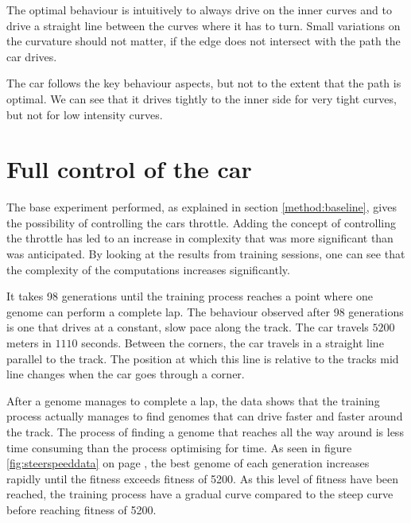 The optimal behaviour is intuitively to always drive on the inner curves and to drive a straight line between the curves where it has to turn. Small variations on the curvature should not matter, if the edge does not intersect with the path the car drives.

The car follows the key behaviour aspects, but not to the extent that the path is optimal. We can see that it drives tightly to the inner side for very tight curves, but not for low intensity curves.



\section{Full control of the car}



The base experiment performed, as explained in section \ref{method:baseline}, gives the possibility of controlling the cars throttle. Adding the concept of controlling the throttle has led to an increase in complexity that was more significant than was anticipated. By looking at the results from training sessions, one can see that the complexity of the computations increases significantly.

It takes 98 generations until the training process reaches a point where one genome can perform a complete lap. The behaviour observed after 98 generations is one that drives at a constant, slow pace along the track. The car travels $5200$ meters in $1110$ seconds. Between the corners, the car travels in a straight line parallel to the track. The position at which this line is relative to the tracks mid line changes when the car goes through a corner.

After a genome manages to complete a lap, the data shows that the training process actually manages to find genomes that can drive faster and faster around the track. The process of finding a genome that reaches all the way around is less time consuming than the process optimising for time. As seen in figure \ref{fig:steerspeeddata} on page \pageref{fig:steerspeeddata}, the best genome of each generation increases rapidly until the fitness exceeds fitness of 5200. As this level of fitness have been reached, the training process have a gradual curve compared to the steep curve before reaching fitness of 5200.

